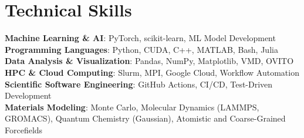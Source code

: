 \section*{Technical Skills}
  \textbf{Machine Learning \& AI}: PyTorch, scikit-learn, ML Model Development \\
  \textbf{Programming Languages}: Python, CUDA, C++, MATLAB, Bash, Julia \\
  \textbf{Data Analysis \& Visualization}: Pandas, NumPy, Matplotlib, VMD, OVITO \\
  \textbf{HPC \& Cloud Computing}: Slurm, MPI, Google Cloud, Workflow Automation \\
  \textbf{Scientific Software Engineering}: GitHub Actions, CI/CD, Test-Driven Development \\
  \textbf{Materials Modeling}: Monte Carlo, Molecular Dynamics (LAMMPS, GROMACS), Quantum Chemistry (Gaussian), Atomistic and Coarse-Grained Forcefields
\vspace{-0.6\baselineskip}
